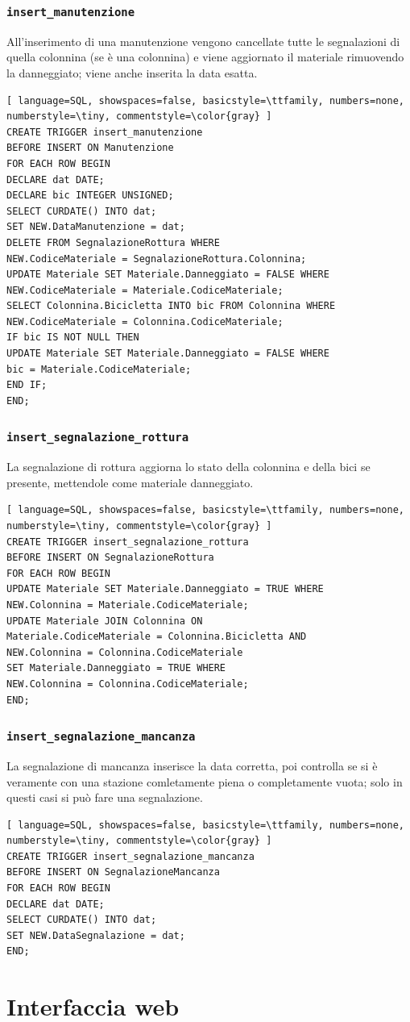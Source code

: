\documentclass[a4paper,twoside]{article}
\begin{document}
\subsubsection{\texttt{insert\_manutenzione}}
All'inserimento di una manutenzione vengono cancellate tutte le segnalazioni di quella colonnina (se è una colonnina) e viene aggiornato il materiale rimuovendo la danneggiato; viene anche inserita la data esatta.
\begin{lstlisting}[ language=SQL, showspaces=false, basicstyle=\ttfamily, numbers=none, numberstyle=\tiny, commentstyle=\color{gray} ]
CREATE TRIGGER insert_manutenzione
BEFORE INSERT ON Manutenzione
FOR EACH ROW BEGIN
DECLARE dat DATE;
DECLARE bic INTEGER UNSIGNED;
SELECT CURDATE() INTO dat;
SET NEW.DataManutenzione = dat;
DELETE FROM SegnalazioneRottura WHERE
NEW.CodiceMateriale = SegnalazioneRottura.Colonnina;
UPDATE Materiale SET Materiale.Danneggiato = FALSE WHERE
NEW.CodiceMateriale = Materiale.CodiceMateriale;
SELECT Colonnina.Bicicletta INTO bic FROM Colonnina WHERE
NEW.CodiceMateriale = Colonnina.CodiceMateriale;
IF bic IS NOT NULL THEN
UPDATE Materiale SET Materiale.Danneggiato = FALSE WHERE
bic = Materiale.CodiceMateriale;
END IF;
END;
\end{lstlisting}
\subsubsection{\texttt{insert\_segnalazione\_rottura}}
La segnalazione di rottura aggiorna lo stato della colonnina e della bici se presente, mettendole come materiale danneggiato.
\begin{lstlisting}[ language=SQL, showspaces=false, basicstyle=\ttfamily, numbers=none, numberstyle=\tiny, commentstyle=\color{gray} ]
CREATE TRIGGER insert_segnalazione_rottura
BEFORE INSERT ON SegnalazioneRottura
FOR EACH ROW BEGIN
UPDATE Materiale SET Materiale.Danneggiato = TRUE WHERE
NEW.Colonnina = Materiale.CodiceMateriale;
UPDATE Materiale JOIN Colonnina ON
Materiale.CodiceMateriale = Colonnina.Bicicletta AND
NEW.Colonnina = Colonnina.CodiceMateriale
SET Materiale.Danneggiato = TRUE WHERE
NEW.Colonnina = Colonnina.CodiceMateriale;
END;
\end{lstlisting}
\subsubsection{\texttt{insert\_segnalazione\_mancanza}}
La segnalazione di mancanza inserisce la data corretta, poi controlla se si è veramente con una stazione comletamente piena o completamente vuota; solo in questi casi si può fare una segnalazione.
\begin{lstlisting}[ language=SQL, showspaces=false, basicstyle=\ttfamily, numbers=none, numberstyle=\tiny, commentstyle=\color{gray} ]
CREATE TRIGGER insert_segnalazione_mancanza
BEFORE INSERT ON SegnalazioneMancanza
FOR EACH ROW BEGIN
DECLARE dat DATE;
SELECT CURDATE() INTO dat;
SET NEW.DataSegnalazione = dat;
END;
\end{lstlisting}
\newpage
\section{Interfaccia web}
\end{document}
